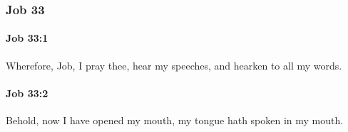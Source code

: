 	\subsubsection{Job 33} %
		\label{JOB-33}

		\paragraph{Job 33:1} %
			\label{JOB-33-1}

			Wherefore, Job, I pray thee, hear my speeches, and hearken to all my words.


		\paragraph{Job 33:2} %
			\label{JOB-33-2}

			Behold, now I have opened my mouth, my tongue hath spoken in my mouth.

